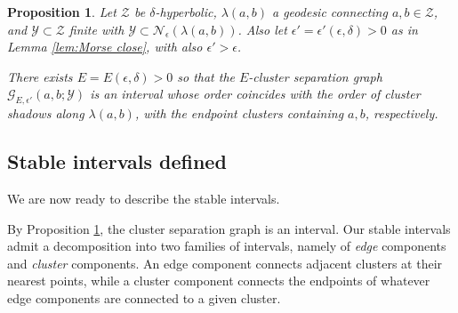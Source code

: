 \documentclass{amsart}
\newtheorem{proposition}[theorem]{Proposition}
\theoremstyle{definition}
\theoremstyle{remark}
\theoremstyle{definition}
\newcommand{\calG}{\mathcal{G}}
\newcommand{\calN}{\mathcal{N}}
\newcommand{\calY}{\mathcal{Y}}
\newcommand{\calZ}{\mathcal{Z}}
\begin{document}
\begin{proposition}\label{prop:cluster sep graph}
Let $\calZ$ be $\delta$-hyperbolic, $\lambda(a,b)$ a geodesic connecting $a,b \in \calZ$, and $\calY \subset \calZ$ finite with $\calY \subset \calN_{\epsilon}(\lambda(a,b))$.  Also let $\epsilon' = \epsilon'(\epsilon, \delta)>0$ as in Lemma \ref{lem:Morse close}, with also $\epsilon' > \epsilon$.

There exists $E = E(\epsilon, \delta)>0$ so that the $E$-cluster separation graph $\calG_{E,\epsilon'}(a,b;\calY)$ is an interval whose order coincides with the order of cluster shadows along $\lambda(a,b)$, with the endpoint clusters containing $a,b$, respectively. 
\end{proposition}



\subsection{Stable intervals defined}

We are now ready to describe the stable intervals.

By Proposition \ref{prop:cluster sep graph}, the cluster separation graph is an interval.  Our stable intervals admit a decomposition into two families of intervals, namely of \emph{edge} components and \emph{cluster} components.  An edge component connects adjacent clusters at their nearest points, while a cluster component connects the endpoints of  whatever edge components are connected to a given cluster.
\end{document}
